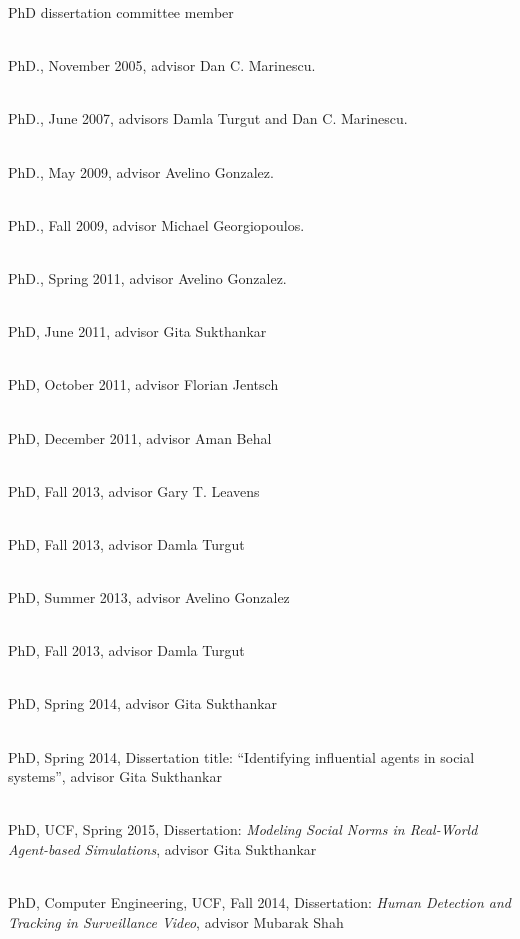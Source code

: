 \begin{category}{PhD dissertation committee member}

\\
PhD., November 2005, advisor Dan C. Marinescu.

\\
PhD., June 2007, advisors Damla Turgut and Dan C. Marinescu.

\\
PhD., May 2009, advisor Avelino Gonzalez.

\\
PhD., Fall 2009, advisor Michael Georgiopoulos.

\\
PhD., Spring 2011, advisor Avelino Gonzalez.

\\
PhD, June 2011, advisor Gita Sukthankar

\\
PhD, October 2011, advisor Florian Jentsch

\\
PhD, December 2011, advisor Aman Behal

\\
PhD, Fall 2013, advisor Gary T. Leavens

\\
PhD, Fall 2013, advisor Damla Turgut

\\
PhD, Summer 2013, advisor Avelino Gonzalez

\\
PhD, Fall 2013, advisor Damla Turgut

\\
PhD, Spring 2014, advisor Gita Sukthankar

\\
PhD, Spring 2014, Dissertation title: ``Identifying influential agents in social systems'', advisor Gita Sukthankar

\\
PhD, UCF, Spring 2015, Dissertation: {\em Modeling Social Norms in Real-World Agent-based Simulations}, advisor Gita Sukthankar

 \\
PhD, Computer Engineering, UCF, Fall 2014, Dissertation: {\em Human Detection and Tracking in Surveillance Video}, advisor Mubarak Shah


\end{category}
